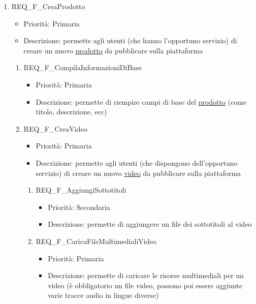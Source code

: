 \begin{enumerate}
	
	\item REQ\_F\_CreaProdotto
		\begin{itemize}
		\item Priorità: Primaria
		\item Descrizione: permette agli utenti (che hanno l'opportuno servizio) di creare un nuovo \hyperlink{AnReqProdMult}{prodotto} da pubblicare sulla piattaforma
		\end{itemize}
		\begin{enumerate}[label*=\arabic*.]
		\item REQ\_F\_CompilaInformazioniDiBase
			\begin{itemize}
			\item Priorità: Primaria
			\item Descrizione: permette di riempire campi di base del \hyperlink{AnReqProdMult}{prodotto} (come titolo, descrizione, ecc)
			\end{itemize}
		\item REQ\_F\_CreaVideo
			\begin{itemize}
			\item Priorità: Primaria
			\item Descrizione: permette agli utenti (che dispongono dell'opportuno servizio) di creare un nuovo \hyperlink{AnReqVideo}{video} da pubblicare sulla piattaforma
			\end{itemize}
			\begin{enumerate}[label*=\arabic*.]
			\item REQ\_F\_AggiungiSottotitoli
				\begin{itemize}
				\item Priorità: Secondaria
				\item Descrizione: permette di aggiungere un file dei sottotitoli al video
				\end{itemize}
			\item REQ\_F\_CaricaFileMultimedialiVideo
				\begin{itemize}
				\item Priorità: Primaria
				\item Descrizione: permette di caricare le risorse multimediali per un video (è obbligatorio un file video, possono poi essere aggiunte varie tracce audio in lingue diverse)
				\end{itemize}
			\end{enumerate}
	

\end{enumerate}
\end{enumerate}
